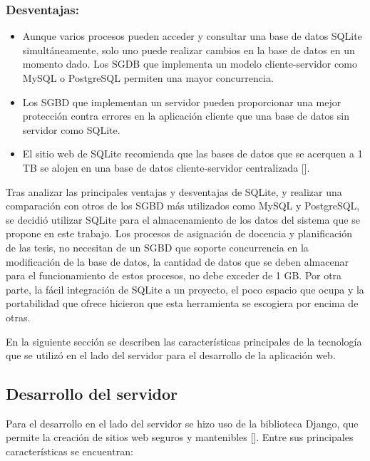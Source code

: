 \subsubsection{Desventajas:}
\begin{itemize}
    \item Aunque varios procesos pueden acceder y consultar una base de datos SQLite simultáneamente, solo 
    uno puede realizar cambios en la base de datos en un momento dado. Los SGDB que implementa un modelo cliente-servidor como MySQL o
    PostgreSQL permiten una mayor concurrencia.
    \item Los SGBD que implementan un servidor pueden proporcionar una mejor protección contra errores en la aplicación 
    cliente que una base de datos sin servidor como SQLite.
    \item El sitio web de SQLite recomienda que las bases de datos que se acerquen a 1 TB se alojen en una base de datos 
    cliente-servidor centralizada [\cite{sqlite_appropriate_use}].
\end{itemize}

Tras analizar las principales ventajas y desventajas de SQLite, y realizar una comparación con otros 
de los SGBD más utilizados como MySQL y PostgreSQL, se decidió utilizar SQLite para el almacenamiento de los 
datos del sistema que se propone en este trabajo. Los procesos de asignación de docencia y planificación de las tesis, no 
necesitan de un SGBD que soporte concurrencia en la modificación de la base de datos, la cantidad de datos que se deben almacenar 
para el funcionamiento de estos procesos, no debe exceder de 1 GB. Por otra parte, la fácil integración de 
SQLite a un proyecto, el poco espacio que ocupa y la portabilidad que ofrece hicieron que esta herramienta se escogiera por 
encima de otras.   



En la siguiente sección se describen las características 
principales de la tecnología 
que se utilizó en el lado del servidor para el desarrollo de la aplicación web.


\subsection{Desarrollo del servidor}

Para el desarrollo en el lado del servidor se hizo uso de la biblioteca Django, que permite 
la creación de sitios web seguros y mantenibles [\cite{django}]. Entre sus principales características
se encuentran:


